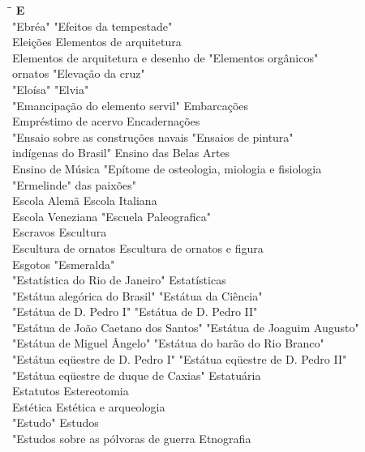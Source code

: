 \begin{tabbing}
	\hspace{8,7cm}\=\hspace{1cm}\=\kill
	\textbf{E} \>  \\ 
	"Ebréa"	\> "Efeitos da tempestade"\\
	Eleições \> Elementos de arquitetura\\
	Elementos de arquitetura e desenho de \> "Elementos orgânicos"\\
	ornatos \> "Elevação da cruz"\\ 
	"Eloísa" \>  "Elvia"\\ 
	"Emancipação do elemento servil" \> Embarcações\\ 
	Empréstimo de acervo \> Encadernações\\
	"Ensaio sobre as construções navais \> "Ensaios de pintura" \\	
	indígenas do Brasil"	\> Ensino das Belas Artes\\
	Ensino de Música \> "Epítome de osteologia, miologia e fisiologia\\
	"Ermelinde" \> das paixões"\\
	Escola Alemã \> Escola Italiana\\ 
	Escola Veneziana \>  "Escuela Paleografica"\\ 
	Escravos \> Escultura\\ 
	Escultura de ornatos \> Escultura de ornatos e figura\\
	Esgotos \> "Esmeralda"\\		   	   
	"Estatística do Rio de Janeiro"	\> Estatísticas\\
	"Estátua alegórica do Brasil" \> "Estátua da Ciência"\\
	"Estátua de D. Pedro I" \> "Estátua de D. Pedro II"\\
	"Estátua de João Caetano dos Santos" \> "Estátua de Joaguim Augusto"\\ 
	"Estátua de Miguel Ângelo" \> "Estátua do barão do Rio Branco"\\ 
	"Estátua eqüestre de D. Pedro I" \> "Estátua eqüestre de D. Pedro II"\\ 
	"Estátua eqüestre de duque de Caxias" \> Estatuária\\
	Estatutos \> Estereotomia \\		   	   
	Estética	\> Estética e arqueologia\\
	"Estudo" \> Estudos\\
	"Estudos sobre as pólvoras de guerra \> Etnografia\\

\end{tabbing}
